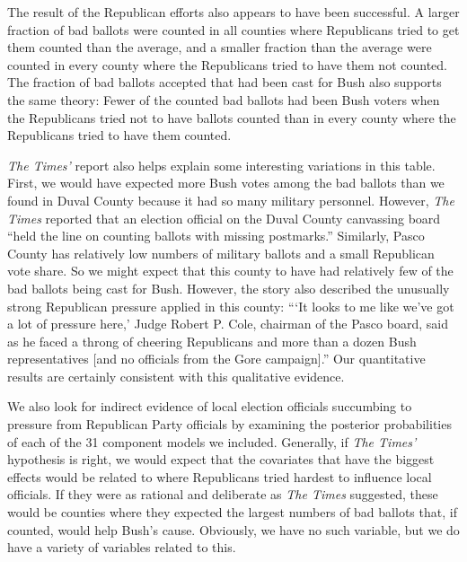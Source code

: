 \documentclass[11pt,titlepage]{article}
\begin{document}
The result of the Republican efforts also appears to have been
successful.  A larger fraction of bad ballots were counted in all
counties where Republicans tried to get them counted than the average,
and a smaller fraction than the average were counted in every county
where the Republicans tried to have them not counted.  
The fraction of bad ballots accepted that had been cast for Bush also
supports the same theory: Fewer of the counted bad ballots had been
Bush voters when the Republicans tried not to have ballots counted
than in every county where the Republicans tried to have them counted.

\emph{The Times'} report also helps explain some interesting
variations in this table.  First, we would have expected more Bush
votes among the bad ballots than we found in Duval County because it
had so many military personnel.  However, \emph{The Times} reported
that an election official on the Duval County canvassing board ``held
the line on counting ballots with missing postmarks.''  Similarly,
Pasco County has relatively low numbers of military ballots and a
small Republican vote share.  So we might expect that this county to
have had relatively few of the bad ballots being cast for Bush.
However, the story also described the unusually strong Republican
pressure applied in this county: ```It looks to me like we've got a
lot of pressure here,' Judge Robert P.  Cole, chairman of the Pasco
board, said as he faced a throng of cheering Republicans and more than
a dozen Bush representatives [and no officials from the Gore
campaign].''  Our quantitative results are certainly consistent with
this qualitative evidence.

We also look for indirect evidence of local election officials
succumbing to pressure from Republican Party officials by examining
the posterior probabilities of each of the 31 component models we
included.  Generally, if \emph{The Times'} hypothesis is right, we
would expect that the covariates that have the biggest effects would
be related to where Republicans tried hardest to influence local
officials.  If they were as rational and deliberate as \emph{The
  Times} suggested, these would be counties where they expected the
largest numbers of bad ballots that, if counted, would help Bush's
cause.  Obviously, we have no such variable, but we do have a variety
of variables related to this.
\end{document}
